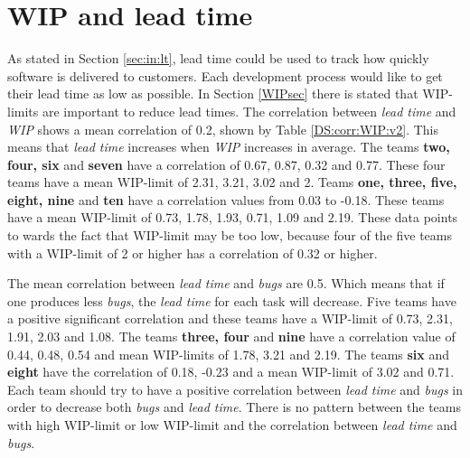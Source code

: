 \documentclass[UKenglish]{ifimaster}  %
\begin{document}

\section{WIP and lead time}
\vspace{-1em}
As stated in Section \ref{sec:in:lt}, lead time could be used to track how quickly software is delivered to customers. Each development process would like to get their lead time as low as possible. In Section \ref{WIPsec} there is stated that WIP-limits are important to reduce lead times. The correlation between \textit{lead time} and \textit{WIP} shows a mean correlation of 0.2, shown by Table \ref{DS:corr:WIP:v2}. This means that \textit{lead time} increases when \textit{WIP} increases in average. The teams \textbf{two, four, six} and \textbf{seven} have a correlation of 0.67, 0.87, 0.32 and 0.77. These four teams have a mean WIP-limit of 2.31, 3.21, 3.02 and 2. Teams \textbf{one, three, five, eight, nine} and \textbf{ten} have a correlation values from 0.03 to -0.18. These teams have a mean WIP-limit of 0.73, 1.78, 1.93, 0.71, 1.09 and 2.19. These data points to wards the fact that WIP-limit may be too low, because four of the five teams with a WIP-limit of 2 or higher has a correlation of 0.32 or higher. 

The mean correlation between \textit{lead time} and \textit{bugs} are 0.5.  Which means that if one produces less \textit{bugs}, the \textit{lead time} for each task will decrease.  Five teams have a positive significant correlation and these teams have a WIP-limit of 0.73, 2.31, 1.91, 2.03 and 1.08. The teams \textbf{three, four} and \textbf{nine} have a correlation value of 0.44, 0.48, 0.54 and mean WIP-limits of 1.78, 3.21 and 2.19. The teams \textbf{six} and \textbf{eight} have the correlation of 0.18, -0.23 and a mean WIP-limit of 3.02 and 0.71. Each team should try to have a positive correlation between \textit{lead time} and \textit{bugs} in order to decrease both \textit{bugs} and \textit{lead time}. There is no pattern between the teams with high WIP-limit or low WIP-limit and the correlation between \textit{lead time} and \textit{bugs}.
\end{document}
